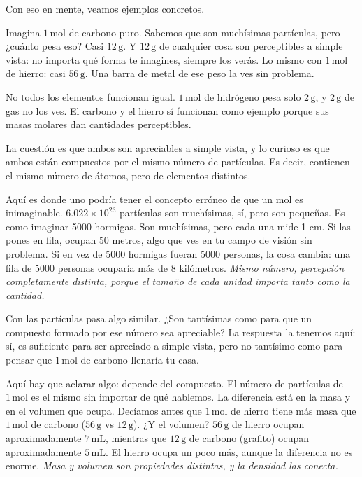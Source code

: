 \medskip
Con eso en mente, veamos ejemplos concretos.

Imagina $1\,\mathrm{mol}$ de carbono puro. Sabemos que son muchísimas 
partículas, pero ¿cuánto pesa eso? Casi $12\,\mathrm{g}$. Y $12\,\mathrm{g}$ de 
cualquier cosa son perceptibles a simple vista: no importa qué forma te 
imagines, siempre los verás. Lo mismo con $1\,\mathrm{mol}$ de hierro: casi 
$56\,\mathrm{g}$. Una barra de metal de ese peso la ves sin problema.

No todos los elementos funcionan igual. $1\,\mathrm{mol}$ de hidrógeno pesa 
solo $2\,\mathrm{g}$, y $2\,\mathrm{g}$ de gas no los ves. El carbono y el 
hierro sí funcionan como ejemplo porque sus masas molares dan cantidades 
perceptibles.

La cuestión es que ambos son apreciables a simple vista, y lo curioso es que 
ambos están compuestos por el mismo número de partículas. Es decir, contienen 
el mismo número de átomos, pero de elementos distintos.

\medskip
Aquí es donde uno podría tener el concepto erróneo de que un mol es 
inimaginable. $6.022\times10^{23}$ partículas son muchísimas, sí, pero son 
pequeñas. Es como imaginar 5000 hormigas. Son muchísimas, pero cada una mide 
1 cm. Si las pones en fila, ocupan 50 metros, algo que ves en tu campo de 
visión sin problema. Si en vez de 5000 hormigas fueran 5000 personas, la cosa 
cambia: una fila de 5000 personas ocuparía más de 8 kilómetros. \textit{Mismo 
número, percepción completamente distinta, porque el tamaño de cada unidad 
importa tanto como la cantidad.}

Con las partículas pasa algo similar. ¿Son tantísimas como para que un 
compuesto formado por ese número sea apreciable? La respuesta la tenemos aquí: 
sí, es suficiente para ser apreciado a simple vista, pero no tantísimo como 
para pensar que $1\,\mathrm{mol}$ de carbono llenaría tu casa.

\medskip
Aquí hay que aclarar algo: depende del compuesto. El número de partículas de 
$1\,\mathrm{mol}$ es el mismo sin importar de qué hablemos. La diferencia está 
en la masa y en el volumen que ocupa. Decíamos antes que $1\,\mathrm{mol}$ de 
hierro tiene más masa que $1\,\mathrm{mol}$ de carbono ($56\,\mathrm{g}$ vs 
$12\,\mathrm{g}$). ¿Y el volumen? $56\,\mathrm{g}$ de hierro ocupan 
aproximadamente $7\,\mathrm{mL}$, mientras que $12\,\mathrm{g}$ de carbono 
(grafito) ocupan aproximadamente $5\,\mathrm{mL}$. El hierro ocupa un poco 
más, aunque la diferencia no es enorme. \textit{Masa y volumen son propiedades 
distintas, y la densidad las conecta.}

